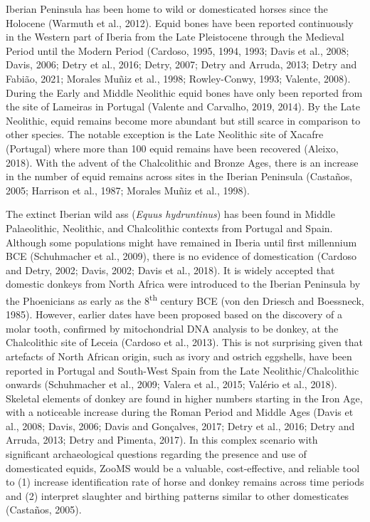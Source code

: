 \documentclass[preprint, 3p, authoryear]{elsarticle} %
\begin{document}
Iberian Peninsula has been home to wild or domesticated horses since the Holocene (Warmuth et al., 2012). Equid bones have been reported continuously in the Western part of Iberia from the Late Pleistocene through the Medieval Period until the Modern Period (Cardoso, 1995, 1994, 1993; Davis et al., 2008; Davis, 2006; Detry et al., 2016; Detry, 2007; Detry and Arruda, 2013; Detry and Fabião, 2021; Morales Muñiz et al., 1998; Rowley-Conwy, 1993; Valente, 2008). During the Early and Middle Neolithic equid bones have only been reported from the site of Lameiras in Portugal (Valente and Carvalho, 2019, 2014). By the Late Neolithic, equid remains become more abundant but still scarce in comparison to other species. The notable exception is the Late Neolithic site of Xacafre (Portugal) where more than 100 equid remains have been recovered (Aleixo, 2018). With the advent of the Chalcolithic and Bronze Ages, there is an increase in the number of equid remains across sites in the Iberian Peninsula (Castaños, 2005; Harrison et al., 1987; Morales Muñiz et al., 1998).

The extinct Iberian wild ass (\emph{Equus hydruntinus}) has been found in Middle Palaeolithic, Neolithic, and Chalcolithic contexts from Portugal and Spain. Although some populations might have remained in Iberia until first millennium BCE (Schuhmacher et al., 2009), there is no evidence of domestication (Cardoso and Detry, 2002; Davis, 2002; Davis et al., 2018). It is widely accepted that domestic donkeys from North Africa were introduced to the Iberian Peninsula by the Phoenicians as early as the 8\textsuperscript{th} century BCE (von den Driesch and Boessneck, 1985). However, earlier dates have been proposed based on the discovery of a molar tooth, confirmed by mitochondrial DNA analysis to be donkey, at the Chalcolithic site of Leceia (Cardoso et al., 2013). This is not surprising given that artefacts of North African origin, such as ivory and ostrich eggshells, have been reported in Portugal and South-West Spain from the Late Neolithic/Chalcolithic onwards (Schuhmacher et al., 2009; Valera et al., 2015; Valério et al., 2018). Skeletal elements of donkey are found in higher numbers starting in the Iron Age, with a noticeable increase during the Roman Period and Middle Ages (Davis et al., 2008; Davis, 2006; Davis and Gonçalves, 2017; Detry et al., 2016; Detry and Arruda, 2013; Detry and Pimenta, 2017). In this complex scenario with significant archaeological questions regarding the presence and use of domesticated equids, ZooMS would be a valuable, cost-effective, and reliable tool to (1) increase identification rate of horse and donkey remains across time periods and (2) interpret slaughter and birthing patterns similar to other domesticates (Castaños, 2005).
\end{document}
